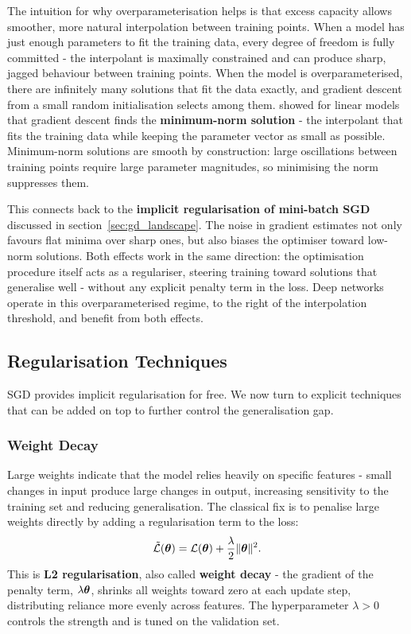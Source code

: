 The intuition for why overparameterisation helps is that excess capacity allows smoother, more natural interpolation between training points. When a model has just enough parameters to fit the training data, every degree of freedom is fully committed - the interpolant is maximally constrained and can produce sharp, jagged behaviour between training points. When the model is overparameterised, there are infinitely many solutions that fit the data exactly, and gradient descent from a small random initialisation selects among them. \textcite{Bartlett2020} showed for linear models that gradient descent finds the \textbf{minimum-norm solution} - the interpolant that fits the training data while keeping the parameter vector as small as possible. Minimum-norm solutions are smooth by construction: large oscillations between training points require large parameter magnitudes, so minimising the norm suppresses them.

This connects back to the \textbf{implicit regularisation of mini-batch SGD} discussed in section~\ref{sec:gd_landscape}. The noise in gradient estimates not only favours flat minima over sharp ones, but also biases the optimiser toward low-norm solutions. Both effects work in the same direction: the optimisation procedure itself acts as a regulariser, steering training toward solutions that generalise well - without any explicit penalty term in the loss. Deep networks operate in this overparameterised regime, to the right of the interpolation threshold, and benefit from both effects.

\subsection{Regularisation Techniques}
\label{sec:regularisation}

SGD provides implicit regularisation for free. We now turn to explicit techniques that can be added on top to further control the generalisation gap.

\subsubsection{Weight Decay}

Large weights indicate that the model relies heavily on specific features - small changes in input produce large changes in output, increasing sensitivity to the training set and reducing generalisation. The classical fix is to penalise large weights directly by adding a regularisation term to the loss:
\begin{equation}
    \tilde{\mathcal{L}}(\boldsymbol{\theta}) = \mathcal{L}(\boldsymbol{\theta}) + \frac{\lambda}{2}\|\boldsymbol{\theta}\|^2.
\end{equation}
This is \textbf{L2 regularisation}, also called \textbf{weight decay} - the gradient of the penalty term, $\lambda \boldsymbol{\theta}$, shrinks all weights toward zero at each update step, distributing reliance more evenly across features. The hyperparameter $\lambda > 0$ controls the strength and is tuned on the validation set.

